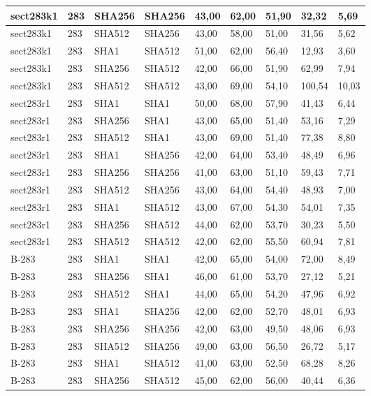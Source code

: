 \begin{longtable}{| l | l | l | l | l |l |l |l |l |}
sect283k1 & 283 & SHA256 & SHA256 & 43,00 & 62,00 & 51,90 & 32,32 & 5,69 \\ \hline 
sect283k1 & 283 & SHA512 & SHA256 & 43,00 & 58,00 & 51,00 & 31,56 & 5,62 \\ \hline 
sect283k1 & 283 & SHA1 & SHA512 & 51,00 & 62,00 & 56,40 & 12,93 & 3,60 \\ \hline 
sect283k1 & 283 & SHA256 & SHA512 & 42,00 & 66,00 & 51,90 & 62,99 & 7,94 \\ \hline 
sect283k1 & 283 & SHA512 & SHA512 & 43,00 & 69,00 & 54,10 & 100,54 & 10,03 \\ \hline 
sect283r1 & 283 & SHA1 & SHA1 & 50,00 & 68,00 & 57,90 & 41,43 & 6,44 \\ \hline 
sect283r1 & 283 & SHA256 & SHA1 & 43,00 & 65,00 & 51,40 & 53,16 & 7,29 \\ \hline 
sect283r1 & 283 & SHA512 & SHA1 & 43,00 & 69,00 & 51,40 & 77,38 & 8,80 \\ \hline 
sect283r1 & 283 & SHA1 & SHA256 & 42,00 & 64,00 & 53,40 & 48,49 & 6,96 \\ \hline 
sect283r1 & 283 & SHA256 & SHA256 & 41,00 & 63,00 & 51,10 & 59,43 & 7,71 \\ \hline 
sect283r1 & 283 & SHA512 & SHA256 & 43,00 & 64,00 & 54,40 & 48,93 & 7,00 \\ \hline 
sect283r1 & 283 & SHA1 & SHA512 & 43,00 & 67,00 & 54,30 & 54,01 & 7,35 \\ \hline 
sect283r1 & 283 & SHA256 & SHA512 & 44,00 & 62,00 & 53,70 & 30,23 & 5,50 \\ \hline 
sect283r1 & 283 & SHA512 & SHA512 & 42,00 & 62,00 & 55,50 & 60,94 & 7,81 \\ \hline 
B-283 & 283 & SHA1 & SHA1 & 42,00 & 65,00 & 54,00 & 72,00 & 8,49 \\ \hline 
B-283 & 283 & SHA256 & SHA1 & 46,00 & 61,00 & 53,70 & 27,12 & 5,21 \\ \hline 
B-283 & 283 & SHA512 & SHA1 & 44,00 & 65,00 & 54,20 & 47,96 & 6,92 \\ \hline 
B-283 & 283 & SHA1 & SHA256 & 42,00 & 62,00 & 52,70 & 48,01 & 6,93 \\ \hline 
B-283 & 283 & SHA256 & SHA256 & 42,00 & 63,00 & 49,50 & 48,06 & 6,93 \\ \hline 
B-283 & 283 & SHA512 & SHA256 & 49,00 & 63,00 & 56,50 & 26,72 & 5,17 \\ \hline 
B-283 & 283 & SHA1 & SHA512 & 41,00 & 63,00 & 52,50 & 68,28 & 8,26 \\ \hline 
B-283 & 283 & SHA256 & SHA512 & 45,00 & 62,00 & 56,00 & 40,44 & 6,36 \\ \hline 

\end{longtable}

